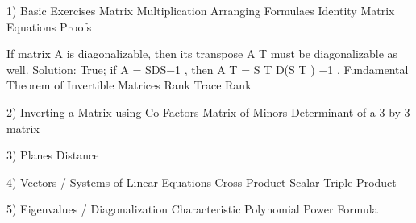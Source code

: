 1) Basic Exercises
	Matrix Multiplication
	Arranging Formulaes
	Identity Matrix Equations
	Proofs





If matrix A is diagonalizable, then its transpose A
T must be diagonalizable as well.
Solution: True; if A = SDS−1
, then A
T = S
T D(S
T
)
−1
.
Fundamental Theorem of Invertible Matrices
 Rank
 Trace
Rank


2) Inverting a Matrix using Co-Factors
	Matrix of Minors
	Determinant of a 3 by 3 matrix

3) Planes
	Distance

4) Vectors / Systems of Linear Equations
	Cross Product
	Scalar Triple Product


5) Eigenvalues / Diagonalization
	Characteristic Polynomial
	Power Formula

